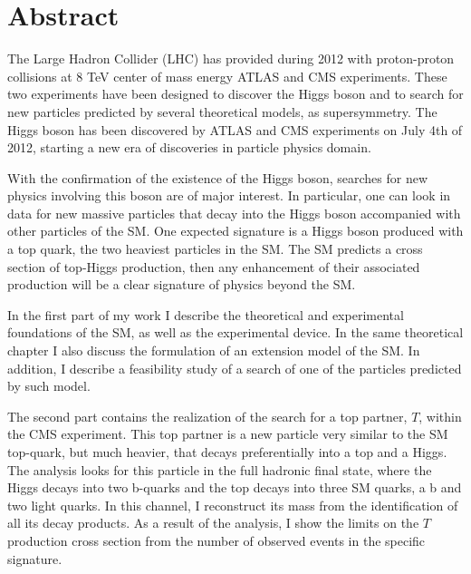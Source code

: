 \begingroup
\let\clearpage\relax
\let\cleardoublepage\relax
\let\cleardoublepage\relax

\chapter*{Abstract}

The Large Hadron Collider (LHC) has provided during 2012 with proton-proton collisions at 8 TeV center of mass energy ATLAS and CMS experiments. These two experiments have been designed to discover the Higgs boson and to search for new particles predicted by several theoretical models, as supersymmetry. The Higgs boson has been discovered by ATLAS and CMS experiments on July 4th of 2012, starting a new era of discoveries in particle physics domain. %

With the confirmation of the existence of the Higgs boson, searches for new physics involving this boson are of major interest. In particular, one can look in data for new massive particles that decay into the Higgs boson accompanied with other particles of the SM. One expected signature is a Higgs boson produced with a top quark, the two heaviest particles in the SM. The SM predicts a cross section of top-Higgs production, then any enhancement of their associated production will be a clear signature of physics beyond the SM.

In the first part of my work I describe the theoretical and experimental foundations of the SM, as well as the experimental device. In the same theoretical chapter I also discuss the formulation of an extension model of the SM. In addition, I describe a feasibility study of a search of one of the particles predicted by such model.

The second part contains the realization of the search for a top partner, $T$, within the CMS experiment. This top partner is a new particle very similar to the SM top-quark, but much heavier, that decays preferentially into a top and a Higgs. The analysis looks for this particle in the full hadronic final state, where the Higgs decays into two b-quarks and the top decays into three SM quarks, a b and two light quarks. In this channel, I reconstruct its mass from the identification of all its decay products. As a result of the analysis, I show the limits on the $T$ production cross section from the number of observed events in the specific signature.

